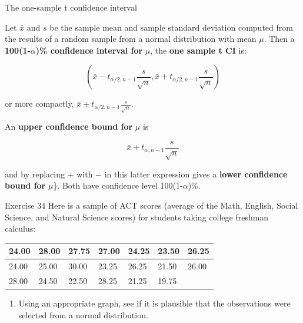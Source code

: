 \documentclass[
  ignorenonframetext,
]{beamer}
\providecommand{\tightlist}{%
  \setlength{\itemsep}{0pt}\setlength{\parskip}{0pt}}\usepackage{longtable,booktabs,array}
\begin{document}
\begin{frame}{The one-sample t confidence interval}
\protect\hypertarget{the-one-sample-t-confidence-interval-1}{}
\begin{tcolorbox}[enhanced jigsaw, titlerule=0mm, colbacktitle=quarto-callout-important-color!10!white, opacityback=0, bottomrule=.15mm, colback=white, colframe=quarto-callout-important-color-frame, arc=.35mm, title=\textcolor{quarto-callout-important-color}{\faExclamation}\hspace{0.5em}{Proposition}, toprule=.15mm, breakable, coltitle=black, leftrule=.75mm, bottomtitle=1mm, left=2mm, rightrule=.15mm, toptitle=1mm, opacitybacktitle=0.6]

Let \(\bar{x}\) and \(s\) be the sample mean and sample standard
deviation computed from the results of a random sample from a normal
distribution with mean \(\mu\). Then a
\textbf{100(1-}\(\alpha\)\textbf{)\% confidence interval for} \(\mu\),
the \textbf{one sample t CI} is:

\[
\left( \bar{x} - t_{\alpha/2,n-1}\frac{s}{\sqrt{n}},  \bar{x} + t_{\alpha/2,n-1}\frac{s}{\sqrt{n}}\right)
\]

or more compactly, \(\bar{x} \pm t_{\alpha/2,n-1}\frac{s}{\sqrt{n}}\).

An \textbf{upper confidence bound for} \(\mu\) is

\[
 \bar{x} + t_{\alpha,n-1}\frac{s}{\sqrt{n}}
\]

and by replacing \(+\) with \(-\) in this latter expression gives a
\textbf{lower confidence bound for} \(\mu\)\}. Both have confidence
level 100(1-\(\alpha\))\%.

\end{tcolorbox}
\end{frame}

\begin{frame}{Exercise 34}
\protect\hypertarget{exercise-34}{}
Here is a sample of ACT scores (average of the Math, English, Social
Science, and Natural Science scores) for students taking college
freshman calculus:

\begin{longtable}[]{@{}lllllll@{}}
\toprule()
24.00 & 28.00 & 27.75 & 27.00 & 24.25 & 23.50 & 26.25 \\
\midrule()
\endhead
24.00 & 25.00 & 30.00 & 23.25 & 26.25 & 21.50 & 26.00 \\
28.00 & 24.50 & 22.50 & 28.25 & 21.25 & 19.75 & \\
\bottomrule()
\end{longtable}

\begin{enumerate}[<+->]
[a.]
\tightlist
\item
  Using an appropriate graph, see if it is plausible that the
  observations were selected from a normal distribution.
\end{enumerate}
\end{frame}
\end{document}
